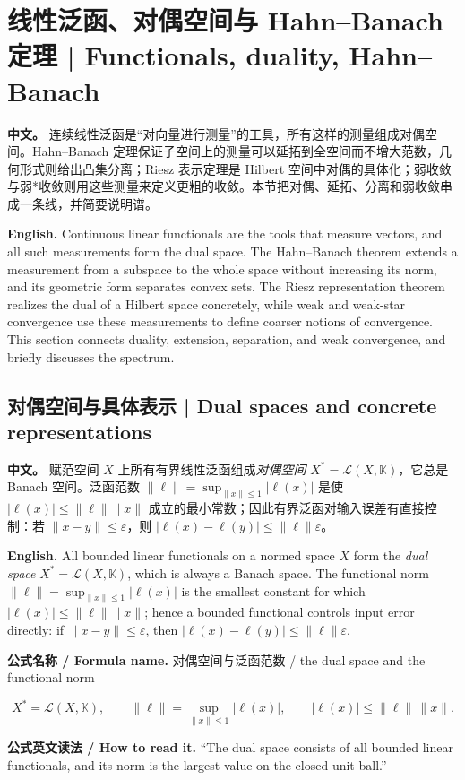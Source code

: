 \documentclass[UTF8,11pt,a4paper]{ctexart}
\newcommand{\READ}[1]{\par\noindent \textbf{公式英文读法 / How to read it.} #1\par}
\newcommand{\FORMULA}[2]{\par\noindent\textbf{公式名称 / Formula name.} #1 / #2\par}
\newcommand{\APS}[2]{\par\noindent\textbf{中文。} #1\par\noindent\textbf{English.} #2\par\smallskip}
\begin{document}
\section[对偶与 Hahn--Banach 定理 | Duality and Hahn--Banach]{线性泛函、对偶空间与 Hahn--Banach 定理 | Functionals, duality, Hahn--Banach}
\APS{连续线性泛函是“对向量进行测量”的工具，所有这样的测量组成对偶空间。Hahn--Banach 定理保证子空间上的测量可以延拓到全空间而不增大范数，几何形式则给出凸集分离；Riesz 表示定理是 Hilbert 空间中对偶的具体化；弱收敛与弱*收敛则用这些测量来定义更粗的收敛。本节把对偶、延拓、分离和弱收敛串成一条线，并简要说明谱。}{Continuous linear functionals are the tools that measure vectors, and all such measurements form the dual space. The Hahn--Banach theorem extends a measurement from a subspace to the whole space without increasing its norm, and its geometric form separates convex sets. The Riesz representation theorem realizes the dual of a Hilbert space concretely, while weak and weak-star convergence use these measurements to define coarser notions of convergence. This section connects duality, extension, separation, and weak convergence, and briefly discusses the spectrum.}

\subsection{对偶空间与具体表示 | Dual spaces and concrete representations}
\APS{赋范空间 $X$ 上所有有界线性泛函组成\emph{对偶空间} $X^*=\mathcal L(X,\mathbb K)$，它总是 Banach 空间。泛函范数 $\|\ell\|=\sup_{\|x\|\le1}|\ell(x)|$ 是使 $|\ell(x)|\le\|\ell\|\|x\|$ 成立的最小常数；因此有界泛函对输入误差有直接控制：若 $\|x-y\|\le\varepsilon$，则 $|\ell(x)-\ell(y)|\le\|\ell\|\varepsilon$。}{All bounded linear functionals on a normed space $X$ form the \emph{dual space} $X^*=\mathcal L(X,\mathbb K)$, which is always a Banach space. The functional norm $\|\ell\|=\sup_{\|x\|\le1}|\ell(x)|$ is the smallest constant for which $|\ell(x)|\le\|\ell\|\|x\|$; hence a bounded functional controls input error directly: if $\|x-y\|\le\varepsilon$, then $|\ell(x)-\ell(y)|\le\|\ell\|\varepsilon$.}
\FORMULA{对偶空间与泛函范数}{the dual space and the functional norm}
\[
X^*=\mathcal L(X,\mathbb K),
\qquad
\|\ell\|=\sup_{\|x\|\le1}|\ell(x)|,
\qquad
|\ell(x)|\le\|\ell\|\,\|x\|.
\]
\READ{``The dual space consists of all bounded linear functionals, and its norm is the largest value on the closed unit ball.''}
\end{document}
